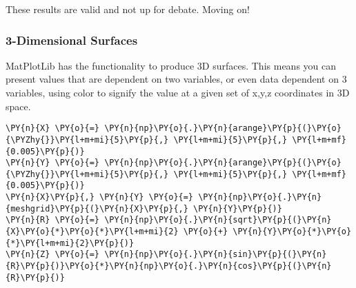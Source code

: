     These results are valid and not up for debate. Moving on!

\hypertarget{dimensional-surfaces}{%
\subsubsection{3-Dimensional Surfaces}\label{dimensional-surfaces}}

MatPlotLib has the functionality to produce 3D surfaces. This means you
can present values that are dependent on two variables, or even data
dependent on 3 variables, using color to signify the value at a given
set of x,y,z coordinates in 3D space.

    \begin{tcolorbox}[breakable, size=fbox, boxrule=1pt, pad at break*=1mm,colback=cellbackground, colframe=cellborder]
\begin{Verbatim}[commandchars=\\\{\}]
\PY{n}{X} \PY{o}{=} \PY{n}{np}\PY{o}{.}\PY{n}{arange}\PY{p}{(}\PY{o}{\PYZhy{}}\PY{l+m+mi}{5}\PY{p}{,} \PY{l+m+mi}{5}\PY{p}{,} \PY{l+m+mf}{0.005}\PY{p}{)}
\PY{n}{Y} \PY{o}{=} \PY{n}{np}\PY{o}{.}\PY{n}{arange}\PY{p}{(}\PY{o}{\PYZhy{}}\PY{l+m+mi}{5}\PY{p}{,} \PY{l+m+mi}{5}\PY{p}{,} \PY{l+m+mf}{0.005}\PY{p}{)}
\PY{n}{X}\PY{p}{,} \PY{n}{Y} \PY{o}{=} \PY{n}{np}\PY{o}{.}\PY{n}{meshgrid}\PY{p}{(}\PY{n}{X}\PY{p}{,} \PY{n}{Y}\PY{p}{)}
\PY{n}{R} \PY{o}{=} \PY{n}{np}\PY{o}{.}\PY{n}{sqrt}\PY{p}{(}\PY{n}{X}\PY{o}{*}\PY{o}{*}\PY{l+m+mi}{2} \PY{o}{+} \PY{n}{Y}\PY{o}{*}\PY{o}{*}\PY{l+m+mi}{2}\PY{p}{)}
\PY{n}{Z} \PY{o}{=} \PY{n}{np}\PY{o}{.}\PY{n}{sin}\PY{p}{(}\PY{n}{R}\PY{p}{)}\PY{o}{*}\PY{n}{np}\PY{o}{.}\PY{n}{cos}\PY{p}{(}\PY{n}{R}\PY{p}{)}


\end{Verbatim}
\end{tcolorbox}
